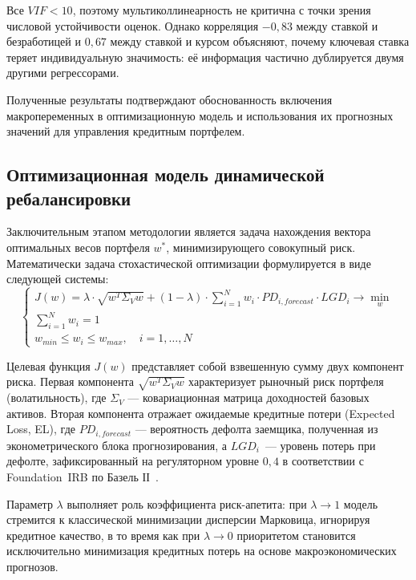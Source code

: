 \documentclass[]{article}
\begin{document}
	Все $VIF < 10$, поэтому мультиколлинеарность не критична с точки зрения числовой
	устойчивости оценок. Однако корреляция $-0{,}83$ между ставкой и безработицей и $0{,}67$ между ставкой и курсом объясняют, почему
	ключевая ставка теряет индивидуальную значимость: её информация частично дублируется
	двумя другими регрессорами.

	Полученные результаты подтверждают обоснованность включения макропеременных в оптимизационную
	модель и использования их прогнозных значений для управления кредитным портфелем.

	\subsection{Оптимизационная модель динамической ребалансировки}

	Заключительным этапом методологии является задача нахождения вектора оптимальных весов портфеля $w^*$,
	минимизирующего совокупный риск. Математически задача стохастической оптимизации формулируется в виде
	следующей системы:
	\begin{equation}
		\label{opt_system}
		\begin{cases}
			J(w) = \lambda \cdot \sqrt{w^T \Sigma_V w} + (1-\lambda) \cdot \sum_{i=1}^N w_i \cdot PD_{i, forecast} \cdot LGD_i \to \min_{w} \\
			\sum_{i=1}^N w_i = 1 \\
			w_{min} \le w_i \le w_{max}, \quad i = 1, \dots, N
		\end{cases}
	\end{equation}

	Целевая функция $J(w)$ представляет собой взвешенную сумму двух компонент риска. Первая компонента
	$\sqrt{w^T \Sigma_V w}$ характеризует рыночный риск портфеля (волатильность), где $\Sigma_V$ ---
	ковариационная матрица доходностей базовых активов. Вторая компонента отражает ожидаемые кредитные
	потери (Expected Loss, EL), где $PD_{i, forecast}$ --- вероятность дефолта заемщика, полученная из
	эконометрического блока прогнозирования, а $LGD_i$~--- уровень потерь при дефолте, зафиксированный
	на регуляторном уровне $0{,}4$ в соответствии с Foundation~IRB по Базель ІІ~\cite{bcbs2006}.

	Параметр $\lambda$ выполняет роль коэффициента риск-апетита: при $\lambda \to 1$ модель стремится
	к классической минимизации дисперсии Марковица, игнорируя кредитное качество, в то время как при
	$\lambda \to 0$ приоритетом становится исключительно минимизация кредитных потерь на основе
	макроэкономических прогнозов.
\end{document}
